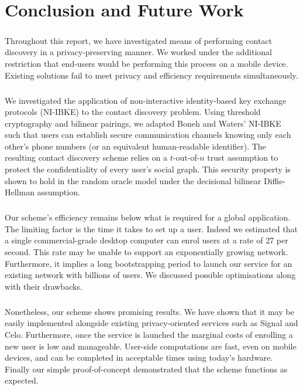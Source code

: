 \chapter{Conclusion and Future Work}
\label{chap:conclusion}

\paragraph{} Throughout this report, we have investigated means of performing contact discovery in a privacy-preserving manner. We worked under the additional restriction that end-users would be performing this process on a mobile device. Existing solutions fail to meet privacy and efficiency requirements simultaneously. 

\paragraph{} We investigated the application of non-interactive identity-based key exchange protocols (NI-IBKE) to the contact discovery problem. Using threshold cryptography and bilinear pairings, we adapted Boneh and Waters' \cite{LRPRF} NI-IBKE such that users can establish secure communication channels knowing only each other's phone numbers (or an equivalent human-readable identifier). The resulting contact discovery scheme relies on a $t$-out-of-$n$ trust assumption to protect the confidentiality of every user's social graph. This security property is shown to hold in the random oracle model under the decisional bilinear Diffie-Hellman assumption.

\paragraph{} Our scheme's efficiency remains below what is required for a global application. The limiting factor is the time it takes to set up a user. Indeed we estimated that a single commercial-grade desktop computer can enrol users at a rate of 27 per second. This rate may be unable to support an exponentially growing network. Furthermore, it implies a long bootstrapping period to launch our service for an existing network with billions of users. We discussed possible optimisations along with their drawbacks.

\paragraph{} Nonetheless, our scheme shows promising results. We have shown that it may be easily implemented alongside existing privacy-oriented services such as Signal and Celo. Furthermore, once the service is launched the marginal costs of enrolling a new user is low and manageable. User-side computations are fast, even on mobile devices, and can be completed in acceptable times using today's hardware. Finally our simple proof-of-concept demonstrated that the scheme functions as expected.


